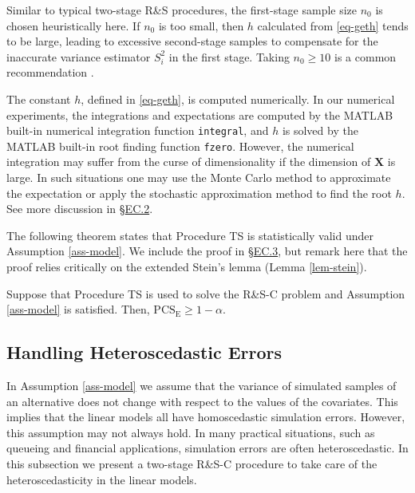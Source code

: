 \documentclass[ijoc,nonblindrev]{informs3}
\def\bX{{\bm X}}
\def\PCSE{\mathrm{PCS}_{\mathrm{E}}}
\begin{document}
\vspace{6pt}
\begin{remark}
Similar to typical two-stage R\&S procedures, the first-stage sample size $n_0$ is chosen heuristically here.
If $n_0$ is too small, then $h$ calculated from \eqref{eq-geth} tends to be large, leading to excessive second-stage samples to compensate for the inaccurate variance estimator $S_i^2$ in the first stage. Taking $n_0 \geq 10$ is a common recommendation \citep{kim2006}.
\end{remark}


\begin{remark}
The constant $h$, defined in \eqref{eq-geth}, is computed numerically.
In our numerical experiments, the integrations and expectations are computed by the MATLAB built-in numerical integration function \texttt{integral}, and $h$ is solved by the MATLAB built-in root finding function \texttt{fzero}.
However, the numerical integration may suffer from the curse of dimensionality if the dimension of $\bX$ is large.
In such situations one may use the Monte Carlo method to approximate the expectation or apply the stochastic approximation method \citep{robbins1951stochastic} to find the root $h$.
See more discussion in \S\hyperlink{EC.2}{EC.2}.
\end{remark}


The following theorem states that Procedure TS is statistically valid under Assumption \ref{ass-model}.
We include the proof in \S\hyperlink{EC.3}{EC.3}, but remark here that the proof relies critically on the extended Stein's lemma (Lemma \ref{lem-stein}).



\begin{theorem} \label{thm-hom}
Suppose that Procedure TS is used to solve the R\&S-C problem and Assumption \ref{ass-model} is satisfied. Then,  $\PCSE \geq 1-\alpha$.
\end{theorem}



\subsection{Handling Heteroscedastic Errors} \label{sec-het}

In Assumption \ref{ass-model} we assume that the variance of simulated samples of an alternative does not change with respect to the values of the covariates.
This implies that the linear models all have homoscedastic simulation errors.
However, this assumption may not always hold.
In many practical situations, such as queueing and financial applications, simulation errors are often heteroscedastic.
In this subsection we present a two-stage R\&S-C procedure to take care of the heteroscedasticity in the linear models.
\end{document}
